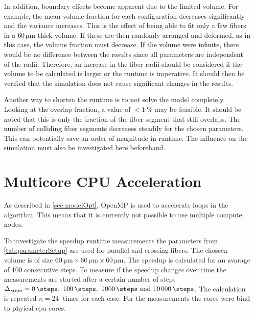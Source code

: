 In addition, boundary effects become apparent due to the limited volume.
For example, the mean volume fraction for each configuration decreases significantly and the variance increases.
This is the effect of being able to fit only a few fibers in a $\SI{60}{\micro\meter}$ thick volume.
If these are then randomly arranged and deformed, as in this case, the volume fraction must decrease.
If the volume were infinite, there would be no difference between the results since all parameters are independent of the radii.
Therefore, an increase in the fiber radii should be considered if the volume to be calculated is larger or the runtime is imperative.
It should then be verified that the simulation does not cause significant changes in the results.
\par
%
Another way to shorten the runtime is to not solve the model completely.
Looking at the overlap fraction, a value of $<\SI{1}{\percent}$ may be feasible.
It should be noted that this is only the fraction of the fiber segment that still overlaps.
The number of colliding fiber segments decreases steadily for the chosen parameters.
This can potentially save an order of magnitude in runtime.
The influence on the simulation must also be investigated here beforehand.
%
%
%
\section{Multicore CPU Acceleration}
%
As described in \cref{sec:modelOpt}, \ac{OpenMP} is used to accelerate  loops in the algorithm.
This means that it is currently not possible to use multiple compute nodes.
\par
% 
To investigate the speedup runtime measurements the parameters from \cref{tab:parameterSetup} are used for parallel and crossing fibers.
The chossen volume is of size $\SI{60}{\micro\meter} \times \SI{60}{\micro\meter} \times \SI{60}{\micro\meter}$.
The speedup is calculated for an avarage of 100 consecutive steps.
To measure if the speedup changes over time the measurements are started after a certain number of steps $\Delta_{\mathit{steps}} = \SIlist{0;100;1000;10000}{\steps}$.
The calculation is repeated $n=\SI{24}{}$ times for each case.
For the measurements the cores were bind to phyical cpu cores.
%
% 
% 
